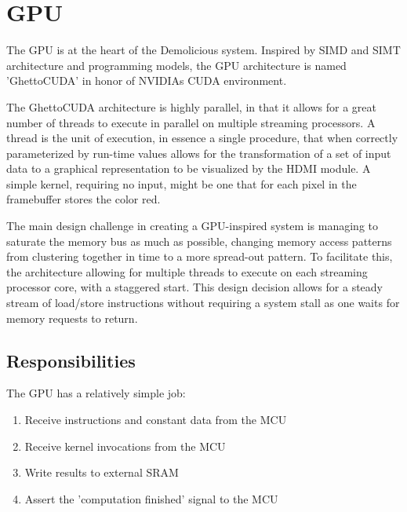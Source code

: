 \documentclass[../main/report.tex]{subfiles}
\begin{document}
\chapter{GPU}

The GPU is at the heart of the Demolicious system.
Inspired by SIMD and SIMT architecture and programming models, the GPU architecture is named 'GhettoCUDA' in honor of NVIDIAs CUDA environment.

The GhettoCUDA architecture is highly parallel, in that it allows for a great number of threads to execute in parallel on multiple streaming processors.
A thread is the unit of execution, in essence a single procedure, that when correctly parameterized by run-time values allows for the transformation of a set of input data to a graphical representation to be visualized by the HDMI module.
A simple kernel, requiring no input, might be one that for each pixel in the framebuffer stores the color red.

The main design challenge in creating a GPU-inspired system is managing to saturate the memory bus as much as possible, changing memory access patterns from clustering together in time to a more spread-out pattern.
To facilitate this, the architecture allowing for multiple threads to execute on each streaming processor core, with a staggered start.
This design decision allows for a steady stream of load/store instructions without requiring a system stall as one waits for memory requests to return.

\section{Responsibilities}

The GPU has a relatively simple job:
\begin{enumerate}
  \item
    Receive instructions and constant data from the MCU
  \item
    Receive kernel invocations from the MCU
  \item
    Write results to external SRAM
  \item
    Assert the 'computation finished' signal to the MCU
\end{enumerate}
\end{document}
